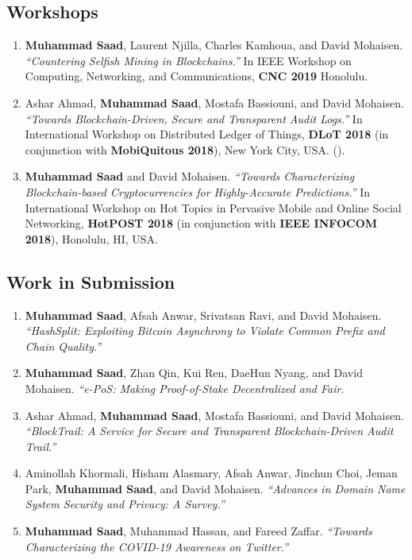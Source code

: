 \documentclass[10pt]{article}
\begin{document}
\subsection*{\sc \textcolor{red!70!black}{ Workshops}}\label{publications}
\begin{enumerate}\itemsep=1.5mm

 \item {\bf Muhammad Saad}, Laurent Njilla, Charles Kamhoua, and David Mohaisen. {\em ``Countering Selfish Mining in Blockchains.''} In IEEE Workshop on Computing, Networking, and Communications, {\bf CNC 2019}  Honolulu.

 \item Ashar Ahmad, {\bf Muhammad Saad}, Mostafa Bassiouni, and David Mohaisen. {\em ``Towards Blockchain-Driven, Secure and Transparent Audit Logs.''} In International Workshop on Distributed Ledger of Things, {\bf DLoT 2018} (in conjunction with {\bf MobiQuitous 2018}),  New York City, USA. ({\color{red!70!black}{ Best Paper Award}}).
 
 \item {\bf Muhammad Saad} and David Mohaisen. {\em ``Towards Characterizing Blockchain-based Cryptocurrencies for Highly-Accurate Predictions.''} In International Workshop on Hot Topics in Pervasive Mobile and Online Social Networking, {\bf HotPOST 2018} (in conjunction with {\bf IEEE INFOCOM 2018}),  Honolulu, HI, USA.


\end{enumerate}






\subsection*{\sc \textcolor{red!70!black}{Work in Submission}}\label{publications}

\begin{enumerate}\itemsep=1.5mm
 
  
\item {\bf Muhammad Saad}, Afsah Anwar, Srivatsan Ravi, and David Mohaisen. {\em ``HashSplit: Exploiting Bitcoin Asynchrony to Violate Common Prefix and Chain Quality.''}

\item {\bf Muhammad Saad}, Zhan Qin, Kui Ren, DaeHun Nyang, and David Mohaisen. {\em ``e-PoS: Making Proof-of-Stake Decentralized and Fair.}


\item Ashar Ahmad, {\bf Muhammad Saad}, Mostafa Bassiouni, and David Mohaisen. {\em ``BlockTrail: A Service for Secure and Transparent Blockchain-Driven Audit Trail.''} 


\item Aminollah Khormali, Hisham Alasmary, Afsah Anwar, Jinchun Choi, Jeman Park, {\bf{Muhammad Saad}}, and David Mohaisen. {\em ``Advances in Domain Name System Security and Privacy: A Survey.''}


\item {\bf {Muhammad Saad}}, Muhammad Hassan, and Fareed Zaffar. {\em ``Towards Characterizing the COVID-19 Awareness on Twitter.''}
\end{enumerate}
\end{document}
